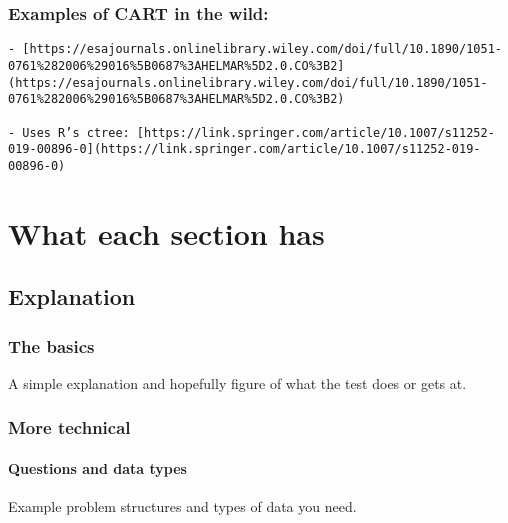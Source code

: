 \documentclass[
]{book}
\begin{document}
\hypertarget{examples-of-cart-in-the-wild}{%
\subsection{Examples of CART in the wild:}\label{examples-of-cart-in-the-wild}}

\begin{verbatim}
- [https://esajournals.onlinelibrary.wiley.com/doi/full/10.1890/1051-0761%282006%29016%5B0687%3AHELMAR%5D2.0.CO%3B2](https://esajournals.onlinelibrary.wiley.com/doi/full/10.1890/1051-0761%282006%29016%5B0687%3AHELMAR%5D2.0.CO%3B2)
    
- Uses R’s ctree: [https://link.springer.com/article/10.1007/s11252-019-00896-0](https://link.springer.com/article/10.1007/s11252-019-00896-0)
\end{verbatim}

\hypertarget{what-each-section-has}{%
\chapter*{What each section has}\label{what-each-section-has}}

\hypertarget{explanation}{%
\section{Explanation}\label{explanation}}

\hypertarget{the-basics}{%
\subsection{The basics}\label{the-basics}}

A simple explanation and hopefully figure of what the test does or gets at.

\hypertarget{more-technical}{%
\subsection{More technical}\label{more-technical}}

\hypertarget{questions-and-data-types-1}{%
\subsubsection{Questions and data types}\label{questions-and-data-types-1}}

Example problem structures and types of data you need.
\end{document}
